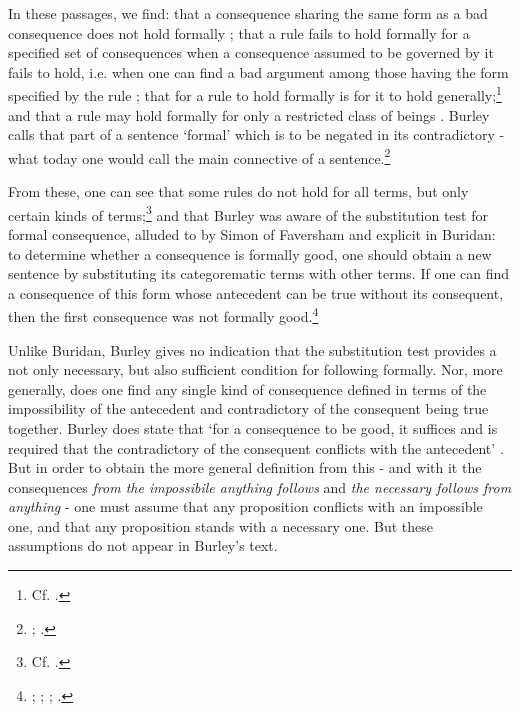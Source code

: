 \documentclass[]{birkjour}
\begin{document}
In these passages, we find: that a consequence sharing the same form as a bad consequence does not hold formally \autocite[p. 25.21]{BurleyDPAL}; that a rule fails to hold formally for a specified set of consequences when a consequence assumed to be governed by it fails to hold, i.e. when one can find a bad argument among those having the form specified by the rule \autocite[p. 130, par. 75]{Green-Pedersen1980b}; that for a rule to hold formally is for it to hold generally;\footnote{Cf. \autocite[p. 130, par. 75, 76]{Green-Pedersen1980b}.} and that a rule may hold formally for only a restricted class of beings \autocite[p. 157-158, par. 159]{Green-Pedersen1980b}. Burley calls that part of a sentence `formal' which is to be negated in its contradictory - what today one would call the main connective of a sentence.\footnote{\autocite[pp. 73.29; 208.12-30]{BurleyDPAL}; \autocite[p. 120, par. 40]{Green-Pedersen1980b}.} 

From these, one can see that some rules do not hold for all terms, but only certain kinds of terms;\footnote{Cf. \autocite[p. 214.14-21]{BurleyDPAL}.} and that Burley was aware of the substitution test for formal consequence, alluded to by Simon of Faversham and explicit in Buridan: to determine whether a consequence is formally good, one should obtain a new sentence by substituting its categorematic terms with other terms. If one can find a consequence of this form whose antecedent can be true without its consequent, then the first consequence was not formally good.\footnote{\autocite[pp. 162-163, par. 168]{Green-Pedersen1980b}; \autocite[p. 150.32-35]{BurleyDPAL}; \autocite[qq. 36-37]{FavershamQE}; \autocite[I. 4]{BuridanTC}.} 

Unlike Buridan, Burley gives no indication that the substitution test provides a not only necessary, but also sufficient condition for following formally. Nor, more generally, does one find any single kind of consequence defined in terms of the impossibility of the antecedent and contradictory of the consequent being true together. Burley does state that `for a consequence to be good, it suffices and is required that the contradictory of the consequent conflicts with the antecedent' \autocite[p. 64.12-14]{BurleyDPAL}. But in order to obtain the more general definition from this - and with it the consequences \textit{from the impossibile anything follows} and \textit{the necessary follows from anything} - one must assume that any proposition conflicts with an impossible one, and that any proposition stands with a necessary one. But these assumptions do not appear in Burley's text.
\end{document}

